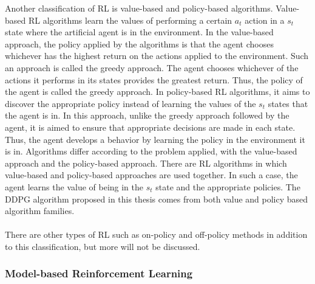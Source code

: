 \documentclass[12pt,twoside,a4]{mwbk}
\begin{document}
Another classification of RL is value-based and policy-based algorithms. Value-based RL algorithms learn the values of performing a certain $a_t$ action in a $s_t$ state where the artificial agent is in the environment. In the value-based approach, the policy applied by the algorithms is that the agent chooses whichever has the highest return on the actions applied to the environment. Such an approach is called the greedy approach. The agent chooses whichever of the actions it performs in its states provides the greatest return. Thus, the policy of the agent is called the greedy approach. In policy-based RL algorithms, it aims to discover the appropriate policy instead of learning the values of the $s_t$ states that the agent is in. In this approach, unlike the greedy approach followed by the agent, it is aimed to ensure that appropriate decisions are made in each state. Thus, the agent develops a behavior by learning the policy in the environment it is in. Algorithms differ according to the problem applied, with the value-based approach and the policy-based approach. There are RL algorithms in which value-based and policy-based approaches are used together. In such a case, the agent learns the value of being in the $s_t$ state and the appropriate policies. The DDPG algorithm proposed in this thesis comes from both value and policy based algorithm families.
\\ \\
There are other types of RL such as on-policy and off-policy methods in addition to this classification, but more will not be discussed.

\subsubsection{Model-based Reinforcement Learning}
\end{document}
